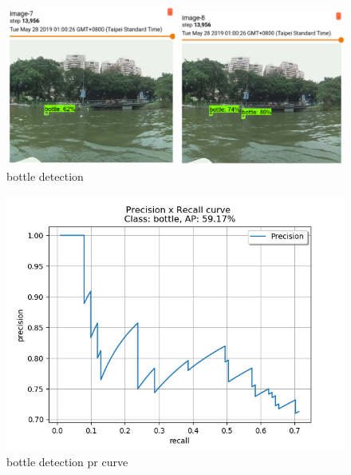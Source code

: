\begin{figure}[ht]
    \includegraphics[width=1\columnwidth]{images/bottle.png}
    \centering
    \caption{bottle detection}
    \label{figure:bottle_dt}
\end{figure}


\begin{figure}[ht]
    \includegraphics[width=1\columnwidth]{images/bottle_pr.png}
    \centering
    \caption{bottle detection pr curve}
    \label{figure:bottle_pr}
\end{figure}